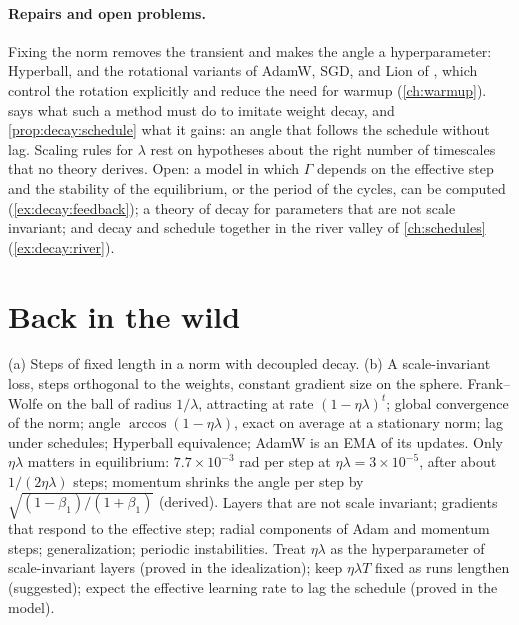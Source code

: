 \begin{refsection}
\paragraph{Repairs and open problems.} Fixing the norm removes the transient and makes the angle a hyperparameter: Hyperball, and the rotational variants of AdamW, SGD, and Lion of \textcite{KossonMessmerJaggi2024}, which control the rotation explicitly and reduce the need for warmup (\cref{ch:warmup}).  says what such a method must do to imitate weight decay, and \cref{prop:decay:schedule} what it gains: an angle that follows the schedule without lag. Scaling rules for $\lambda$ \parencite{LoshchilovHutter2019,WangAitchison2025} rest on hypotheses about the right number of timescales that no theory derives. Open: a model in which $\Gamma$ depends on the effective step and the stability of the equilibrium, or the period of the cycles, can be computed (\cref{ex:decay:feedback}); a theory of decay for parameters that are not scale invariant; and decay and schedule together in the river valley of \cref{ch:schedules} (\cref{ex:decay:river}).

\section{Back in the wild}\label{sec:decay:back}

{(a) Steps of fixed length in a norm with decoupled decay. (b) A scale-invariant loss, steps orthogonal to the weights, constant gradient size on the sphere.}
{Frank--Wolfe on the ball of radius $1/\lambda$, attracting at rate $(1-\eta\lambda)^t$; global convergence of the norm; angle $\arccos(1-\eta\lambda)$, exact on average at a stationary norm; lag under schedules; Hyperball equivalence; AdamW is an EMA of its updates.}
{Only $\eta\lambda$ matters in equilibrium: $7.7\times10^{-3}$ rad per step at $\eta\lambda=3\times10^{-5}$, after about $1/(2\eta\lambda)$ steps; momentum shrinks the angle per step by $\sqrt{(1-\beta_1)/(1+\beta_1)}$ (derived).}
{Layers that are not scale invariant; gradients that respond to the effective step; radial components of Adam and momentum steps; generalization; periodic instabilities.}
{Treat $\eta\lambda$ as the hyperparameter of scale-invariant layers (proved in the idealization); keep $\eta\lambda T$ fixed as runs lengthen (suggested); expect the effective learning rate to lag the schedule (proved in the model).}


\end{refsection}
